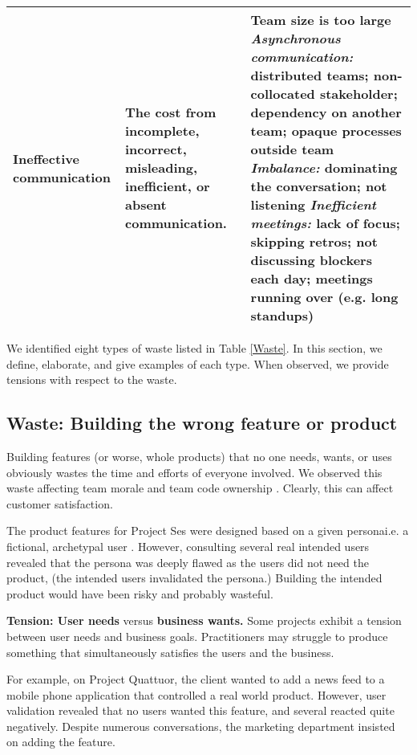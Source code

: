 \begin{table*}[t]
\begin{tabular}{|p{1.7in}|p{1.9in}|p{3in}|}
Ineffective communication             & The cost from incomplete, incorrect, misleading, inefficient, or absent communication.                         & Team size is too large \newline \textit{Asynchronous communication:} distributed teams; non-collocated stakeholder; dependency on another team; opaque processes outside team \newline \textit{Imbalance:} dominating the conversation; not listening \newline \textit{Inefficient meetings:} lack of focus; skipping retros; not discussing blockers each day; meetings running over (e.g. long standups) \\ \hline                  
\end{tabular}
\end{table*}

We identified eight types of waste listed in Table \ref{Waste}. In this section, we define, elaborate, and give examples of each type. When observed, we provide tensions with respect to the waste.
\subsection{Waste: Building the wrong feature or product}
Building features (or worse, whole products) that no one needs, wants, or uses obviously wastes the time and efforts of everyone involved. We observed this waste affecting team morale and team code ownership \cite{SedanoTeamCodeOwnership}. Clearly, this can affect customer satisfaction. 

The product features for Project Ses were designed based on a given persona\textemdash i.e. a fictional, archetypal user \cite{Grudin2002personas}. However, consulting several real intended users revealed that the persona was deeply flawed as the users did not need the product, (the intended users invalidated the persona.) Building the intended product would have been risky and probably wasteful. 

\textbf{Tension: User needs} versus \textbf{business wants.}
Some projects exhibit a tension between user needs and business goals. Practitioners may struggle to produce something that simultaneously satisfies the users and the business.

For example, on Project Quattuor, the client wanted to add a news feed to a mobile phone application that controlled a real world product. However, user validation revealed that no users wanted this feature, and several reacted quite negatively. Despite numerous conversations, the marketing department insisted on adding the feature. 
